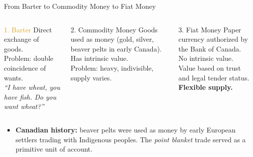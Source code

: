 \documentclass[aspectratio=169]{beamer}
\begin{document}
\begin{frame}{From Barter to Commodity Money to Fiat Money}
\transfade
\begin{columns}
\begin{block}{\textcolor{goldenrod}{1. Barter}}
Direct exchange of goods.\\
Problem: double coincidence of wants.\\
\textit{``I have wheat, you have fish. Do you want wheat?''}
\end{block}
\begin{block}{\textcolor{deeporange}{2. Commodity Money}}
Goods used as money (gold, silver, beaver pelts in early Canada).\\
Has intrinsic value.\\
Problem: heavy, indivisible, supply varies.
\end{block}
\begin{block}{\textcolor{accent}{3. Fiat Money}}
Paper currency authorized by the Bank of Canada.\\
No intrinsic value.\\
Value based on trust and legal tender status.\\
\textbf{Flexible supply.}
\end{block}
\end{columns}
\vspace{0.5em}
\begin{itemize}[<+->]
  \item \textbf{Canadian history:} beaver pelts were used as money by early European settlers trading with Indigenous peoples. The \textit{point blanket} trade served as a primitive unit of account.
\end{itemize}
\end{frame}
\end{document}
